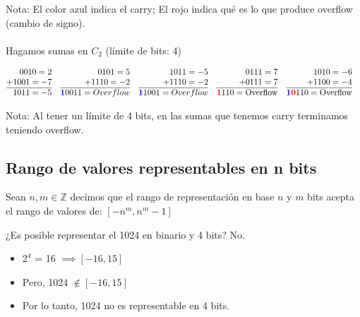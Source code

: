 \documentclass[10pt,a4paper]{article}
\begin{document}
Nota: El color azul indica el carry; El rojo indica qué es lo que produce overflow (cambio de signo).
\\
\\
Hagamos sumas en \(C_{2}\) (límite de bits: 4)

\begin{align*}
    &\begin{array}{@{} r@{}}
      0010 = 2 \\
    + 1001 = -7\\
    \hline
    \ 1011 = -5
    \end{array}
    &&
    \begin{array}{@{} r @{}}
       0101 = 5 \\
    + 1110 = -2 \\
    \hline
    \textcolor{blue}{\textbf{1}}0011 = Overflow
    \end{array}
    &&
    \begin{array}{@{} r @{}}
       1011 = -5 \\
    + 1110 = -2 \\
    \hline
    \textcolor{blue}{\textbf{1}}1001 = Overflow
    \end{array}
    &&
    \begin{array}{@{} r @{}}
       0111 = 7 \\
    + 0111 = 7\\
    \hline
    \textcolor{red}{\textbf{1}}110 = \text{Overflow}
    \end{array}
    &&
    \begin{array}{@{} r @{}}
       1010 = -6 \\
    + 1100 = -4 \\
    \hline
    \textcolor{blue}{\textbf{1}}\textcolor{red}{\textbf{0}}110 = \text{Overflow}
    \end{array}
    \end{align*}

Nota: Al tener un límite de 4 bits, en las sumas que tenemos carry terminamos teniendo overflow.

\subsection*{Rango de valores representables en n bits}
Sean \( n, m \in \mathbb{Z} \) decimos que el rango de representación en base \(n\) y \(m\) bits acepta el rango de valores de: 
\(
\left[ -n^m, n^m - 1 \right]
\)

¿Es posible representar el 1024 en binario y 4 bits? No.
\begin{itemize}
    \item \(2^4\) = 16 \(\implies [-16, 15]\)
    \item Pero, 1024 \(\notin [-16, 15]\)
    \item Por lo tanto, 1024 no es representable en 4 bits.
\end{itemize} 
\end{document}
